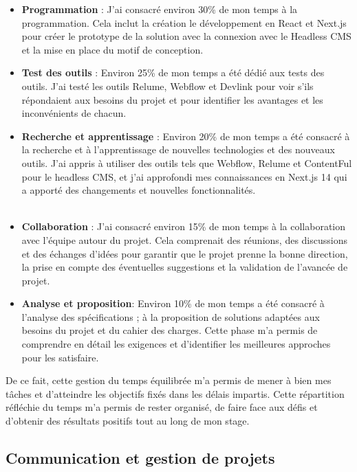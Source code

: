 \begin{itemize}
\item \textbf{Programmation} : J'ai consacré environ 30\% de mon temps à la programmation. Cela inclut la création le développement en React et Next.js pour créer le prototype de la solution avec la connexion avec le Headless CMS et la mise en place du motif de conception.

\item \textbf{Test des outils} : Environ 25\% de mon temps a été dédié aux tests des outils. J'ai testé les outils Relume, Webflow et Devlink pour voir s'ils répondaient aux besoins du projet et pour identifier les avantages et les inconvénients de chacun.

\item \textbf{Recherche et apprentissage} : Environ 20\% de mon temps a été consacré à la recherche et à l'apprentissage de nouvelles technologies et des nouveaux outils. J'ai appris à utiliser des outils tels que Webflow, Relume et ContentFul pour le headless CMS, et j'ai approfondi mes connaissances en Next.js 14 qui a apporté des changements et nouvelles fonctionnalités.
\\ \\
\vspace*{1cm}
\item \textbf{Collaboration} : J'ai consacré environ 15\% de mon temps à la collaboration avec l'équipe autour du projet. Cela comprenait des réunions, des discussions et des échanges d'idées pour garantir que le projet prenne la bonne direction, la prise en compte des éventuelles suggestions et la validation de l'avancée de projet.

\item \textbf{Analyse et proposition}: Environ 10\% de mon temps a été consacré à l'analyse des spécifications ; à la proposition de solutions adaptées aux besoins du projet et du cahier des charges. Cette phase m'a permis de comprendre en détail les exigences et d'identifier les meilleures approches pour les satisfaire.
\end{itemize}

De ce fait, cette gestion du temps équilibrée m'a permis de mener à bien mes tâches et d'atteindre les objectifs fixés dans les délais impartis. Cette répartition réfléchie du temps m'a permis de rester organisé, de faire face aux défis et d'obtenir des résultats positifs tout au long de mon stage.

\subsection*{Communication et gestion de projets}

